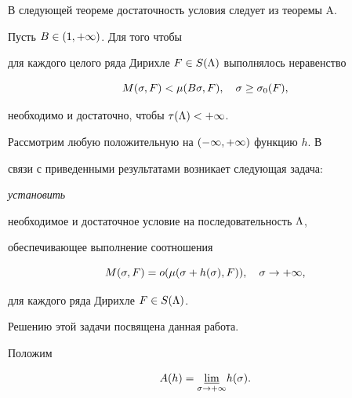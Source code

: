 В следующей теореме достаточность условия следует из теоремы A.





\begin{athm}


Пусть $B\in(1,+\infty)$. Для того чтобы


для каждого целого ряда Дирихле $F\in S(\Lambda)$ выполнялось неравенство 


$$


\M<\mu(B\s,F),\q \s\ge\s_0(F),


$$


необходимо и достаточно, чтобы $\tau(\Lambda)<+\infty$.


\end{athm}





Рассмотрим любую положительную на $(-\infty,+\infty)$ функцию $h$. В


связи с приведенными результатами возникает следующая задача: {\it установить


необходимое и достаточное условие на последовательность $\Lambda$,


обеспечивающее выполнение соотношения}


\begin{equation}


\M=o(\mu(\s+h(\s),F)),\q \s\to+\i,


\end{equation}


для каждого ряда Дирихле $F\in S(\Lambda)$. 





Решению этой задачи посвящена данная работа.





Положим 


$$


A(h)=\underset{\s\to+\i}\nl{}h(\s).


$$





